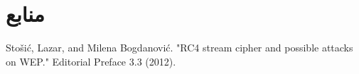 \documentclass{article}
\begin{document}
\section*{منابع}
\renewcommand{\section}[2]{}%
\begin{thebibliography}{99} %


\begin{LTRitems}

\resetlatinfont

 Stošić, Lazar, and Milena Bogdanović. "RC4 stream cipher and possible attacks on WEP." Editorial Preface 3.3 (2012).
\end{LTRitems}

\end{thebibliography}
\end{document}
